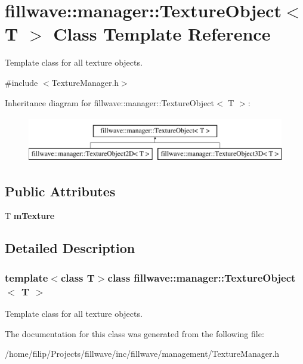 \hypertarget{classfillwave_1_1manager_1_1TextureObject}{}\section{fillwave\+:\+:manager\+:\+:Texture\+Object$<$ T $>$ Class Template Reference}
\label{classfillwave_1_1manager_1_1TextureObject}


Template class for all texture objects.  




{\ttfamily \#include $<$Texture\+Manager.\+h$>$}

Inheritance diagram for fillwave\+:\+:manager\+:\+:Texture\+Object$<$ T $>$\+:\begin{figure}[H]
\begin{center}
\leavevmode
\includegraphics[height=2.000000cm]{classfillwave_1_1manager_1_1TextureObject}
\end{center}
\end{figure}
\subsection*{Public Attributes}
\begin{DoxyCompactItemize}
\item 
\hypertarget{classfillwave_1_1manager_1_1TextureObject_a553e1e0eecbf8b289d595faf795d1eed}{}T {\bfseries m\+Texture}\label{classfillwave_1_1manager_1_1TextureObject_a553e1e0eecbf8b289d595faf795d1eed}

\end{DoxyCompactItemize}


\subsection{Detailed Description}
\subsubsection*{template$<$class T$>$class fillwave\+::manager\+::\+Texture\+Object$<$ T $>$}

Template class for all texture objects. 

The documentation for this class was generated from the following file\+:\begin{DoxyCompactItemize}
\item 
/home/filip/\+Projects/fillwave/inc/fillwave/management/Texture\+Manager.\+h\end{DoxyCompactItemize}
